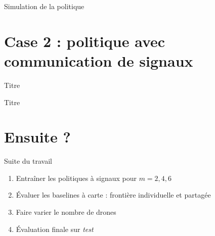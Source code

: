 \documentclass[aspectratio=169,11pt]{beamer}
\begin{document}
\begin{frame}{Simulation de la politique}
\end{frame}

\section{Case 2 : politique avec communication de signaux}

\begin{frame}{Titre}
\end{frame}

\begin{frame}{Titre}
\end{frame}

\section{Ensuite ?}

\begin{frame}{Suite du travail}
  \begin{enumerate}
    \item Entraîner les politiques à signaux pour $m = 2, 4, 6$
    \item Évaluer les baselines à carte : frontière individuelle et partagée
    \item Faire varier le nombre de drones
    \item Évaluation finale sur \emph{test}
  \end{enumerate}
\end{frame}
\end{document}
